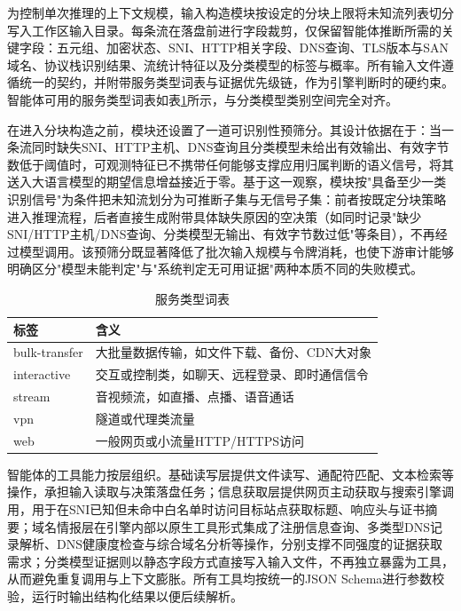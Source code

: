 为控制单次推理的上下文规模，输入构造模块按设定的分块上限将未知流列表切分写入工作区输入目录。每条流在落盘前进行字段裁剪，仅保留智能体推断所需的关键字段：五元组、加密状态、SNI、HTTP相关字段、DNS查询、TLS版本与SAN域名、协议栈识别结果、流统计特征以及分类模型的标签与概率。所有输入文件遵循统一的契约，并附带服务类型词表与证据优先级链，作为引擎判断时的硬约束。智能体可用的服务类型词表如表\ref{tab:ch4-vocab}所示，与分类模型类别空间完全对齐。

在进入分块构造之前，模块还设置了一道可识别性预筛分。其设计依据在于：当一条流同时缺失SNI、HTTP主机、DNS查询且分类模型未给出有效输出、有效字节数低于阈值时，可观测特征已不携带任何能够支撑应用归属判断的语义信号，将其送入大语言模型的期望信息增益接近于零。基于这一观察，模块按"具备至少一类识别信号"为条件把未知流划分为可推断子集与无信号子集：前者按既定分块策略进入推理流程，后者直接生成附带具体缺失原因的空决策（如同时记录"缺少SNI/HTTP主机/DNS查询、分类模型无输出、有效字节数过低"等条目），不再经过模型调用。该预筛分既显著降低了批次输入规模与令牌消耗，也使下游审计能够明确区分"模型未能判定"与"系统判定无可用证据"两种本质不同的失败模式。

\begin{table}[h]
	\centering
	\caption{服务类型词表}\label{tab:ch4-vocab}
	\small
	\begin{tabular}{ll}
		\toprule
		标签 & 含义 \\
		\midrule
		bulk-transfer & 大批量数据传输，如文件下载、备份、CDN大对象 \\
		interactive & 交互或控制类，如聊天、远程登录、即时通信信令 \\
		stream & 音视频流，如直播、点播、语音通话 \\
		vpn & 隧道或代理类流量 \\
		web & 一般网页或小流量HTTP/HTTPS访问 \\
		\bottomrule
	\end{tabular}
\end{table}

智能体的工具能力按层组织。基础读写层提供文件读写、通配符匹配、文本检索等操作，承担输入读取与决策落盘任务；信息获取层提供网页主动获取与搜索引擎调用，用于在SNI已知但未命中白名单时访问目标站点获取标题、响应头与证书摘要；域名情报层在引擎内部以原生工具形式集成了注册信息查询、多类型DNS记录解析、DNS健康度检查与综合域名分析等操作，分别支撑不同强度的证据获取需求；分类模型证据则以静态字段方式直接写入输入文件，不再独立暴露为工具，从而避免重复调用与上下文膨胀。所有工具均按统一的JSON Schema进行参数校验，运行时输出结构化结果以便后续解析。

